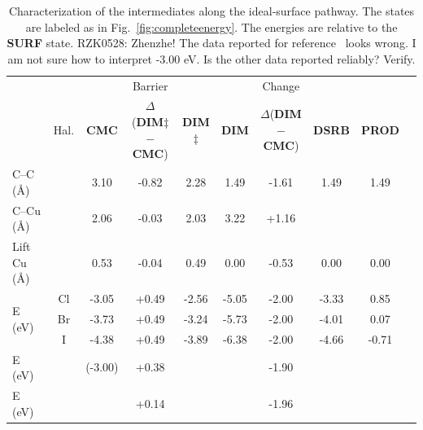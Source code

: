 \documentclass[%
 reprint,
 amsmath,amssymb,
 aps,
prb,
floatfix,
]{revtex4-2}
\newcommand{\comm}{\color{ForestGreen}} %
\begin{document}
\begin{table}
\centering
\caption{Characterization of the intermediates along the ideal-surface pathway. The states are labeled as in Fig.~\ref{fig:completeenergy}. The energies are relative to the \textbf{SURF} state.  %
{\comm RZK0528: Zhenzhe! The data reported for reference~\cite{pccp2010} looks wrong. I am not sure how to interpret -3.00 eV. Is the other data reported reliably? Verify. } 
}
\label{table:idealsurface}
\begin{tabular}{ lccccccccc  }
 \hline
 \hline
  & & & Barrier & & & Change & &\\
  & Hal. & \textbf{CMC} & $\Delta$(\textbf{DIM$\ddagger$}$-$\textbf{CMC}) & \textbf{DIM$\ddagger$} & \textbf{DIM} & $\Delta$(\textbf{DIM}$-$\textbf{CMC}) & \textbf{DSRB} & \textbf{PROD} \\ 
 \hline 
 C--C (\si{\angstrom}) & & 3.10 & -0.82 & 2.28 & 1.49 & -1.61 & 1.49 & 1.49 \\ 
 \hline
 C--Cu (\si{\angstrom}) & & 2.06 & -0.03 & 2.03 & 3.22 & +1.16 & & \\
 \hline
 Lift Cu (\si{\angstrom}) & & 0.53 & -0.04 & 0.49 & 0.00 & -0.53 & 0.00 & 0.00 \\
 \hline
 \multirow{3}{*}{E (\si{\electronvolt}) } & Cl & -3.05 &+0.49 &-2.56 & -5.05 & -2.00& -3.33&0.85\\ 
 & Br & -3.73 &+0.49 & -3.24& -5.73 & -2.00& -4.01&0.07\\ 
 & I  & -4.38 & +0.49& -3.89& -6.38 & -2.00& -4.66&-0.71\\ 
 \hline
 E (\si{\electronvolt})~\cite{pccp2010} & & (-3.00) & +0.38 & & & -1.90 & & \\
 \hline
 E (\si{\electronvolt})~\cite{jacs2013} & & & +0.14 & & & -1.96 & &\\
 \hline
 \hline
\end{tabular}
\end{table}
\end{document}
